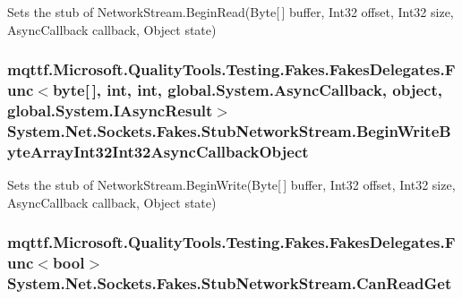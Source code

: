 Sets the stub of Network\-Stream.\-Begin\-Read(\-Byte\mbox{[}$\,$\mbox{]} buffer, Int32 offset, Int32 size, Async\-Callback callback, Object state)

\hypertarget{class_system_1_1_net_1_1_sockets_1_1_fakes_1_1_stub_network_stream_a68fca711b667fe9aaa9bbf37269091ab}{
\subsubsection[{Begin\-Write\-Byte\-Array\-Int32\-Int32\-Async\-Callback\-Object}]{\setlength{\rightskip}{0pt plus 5cm}mqttf.\-Microsoft.\-Quality\-Tools.\-Testing.\-Fakes.\-Fakes\-Delegates.\-Func$<$byte\mbox{[}$\,$\mbox{]}, int, int, global.\-System.\-Async\-Callback, object, global.\-System.\-I\-Async\-Result$>$ System.\-Net.\-Sockets.\-Fakes.\-Stub\-Network\-Stream.\-Begin\-Write\-Byte\-Array\-Int32\-Int32\-Async\-Callback\-Object}}\label{class_system_1_1_net_1_1_sockets_1_1_fakes_1_1_stub_network_stream_a68fca711b667fe9aaa9bbf37269091ab}


Sets the stub of Network\-Stream.\-Begin\-Write(\-Byte\mbox{[}$\,$\mbox{]} buffer, Int32 offset, Int32 size, Async\-Callback callback, Object state)

\hypertarget{class_system_1_1_net_1_1_sockets_1_1_fakes_1_1_stub_network_stream_ab7e6a252fd10048c802aba3848084a56}{
\subsubsection[{Can\-Read\-Get}]{\setlength{\rightskip}{0pt plus 5cm}mqttf.\-Microsoft.\-Quality\-Tools.\-Testing.\-Fakes.\-Fakes\-Delegates.\-Func$<$bool$>$ System.\-Net.\-Sockets.\-Fakes.\-Stub\-Network\-Stream.\-Can\-Read\-Get}}\label{class_system_1_1_net_1_1_sockets_1_1_fakes_1_1_stub_network_stream_ab7e6a252fd10048c802aba3848084a56}


